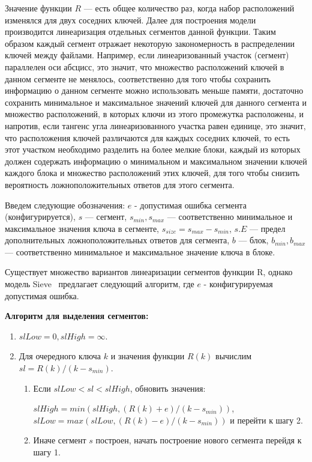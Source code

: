 Значение функции $R$ --- есть общее количество раз, когда набор расположений изменялся для двух соседних ключей.
Далее для построения модели производится линеаризация отдельных сегментов данной функции.
Таким образом каждый сегмент отражает некоторую закономерность в распределении ключей между файлами.
Например, если линеаризованный участок (сегмент) параллелен оси абсцисс, это значит, что множество расположений ключей в данном сегменте не менялось, соответственно для того чтобы сохранить информацию о данном сегменте можно использовать меньше памяти, достаточно сохранить минимальное и максимальное значений ключей для данного сегмента и множество расположений, в которых ключи из этого промежутка расположены, и напротив, если тангенс угла линеаризованного участка равен единице, это значит, что расположения ключей различаются для каждых соседних ключей, то есть этот участком необходимо разделить на более мелкие блоки, каждый из которых должен содержать информацию о минимальном и максимальном значении ключей каждого блока и множество расположений этих ключей, для того чтобы снизить вероятность ложноположительных ответов для этого сегмента.

Введем следующие обозначения:
$e$ - допустимая ошибка сегмента (конфигурируется), $s$ --- сегмент, $s_{min}, s_{max}$ --- соответственно минимальное и максимальное значения ключа в сегменте, $s_{size} = s_{max} - s_{min}$, $s.E$ --- предел дополнительных ложноположительных ответов для сегмента, $b$ --- блок, $b_{min}, b_{max}$ --- соответственно минимальное и максимальное значение ключа в блоке.

Существует множество вариантов линеаризации сегментов функции R, однако модель Sieve~\cite{Sieve} предлагает следующий алгоритм, где $e$ - конфигурируемая допустимая ошибка.

\textbf{Алгоритм для выделения сегментов:}
\begin{enumerate}
\item $slLow = 0, slHigh = \infty$.
\item Для очередного ключа $k$ и значения функции $R(k)$ вычислим \mbox{$sl = R(k) / (k - s_{min})$}.
    \begin{enumerate}
    \item Если \mbox{$slLow < sl < slHigh$}, обновить значения:
    
    \mbox{$slHigh = min(slHigh, (R(k) + e) / (k - s_{min}))$}, \mbox{$slLow = max(slLow, (R(k) - e) / (k - s_{min}))$} и перейти к шагу 2.
    \item Иначе сегмент $s$ построен, начать построение нового сегмента перейдя к шагу 1.
    \end{enumerate}
\end{enumerate}


